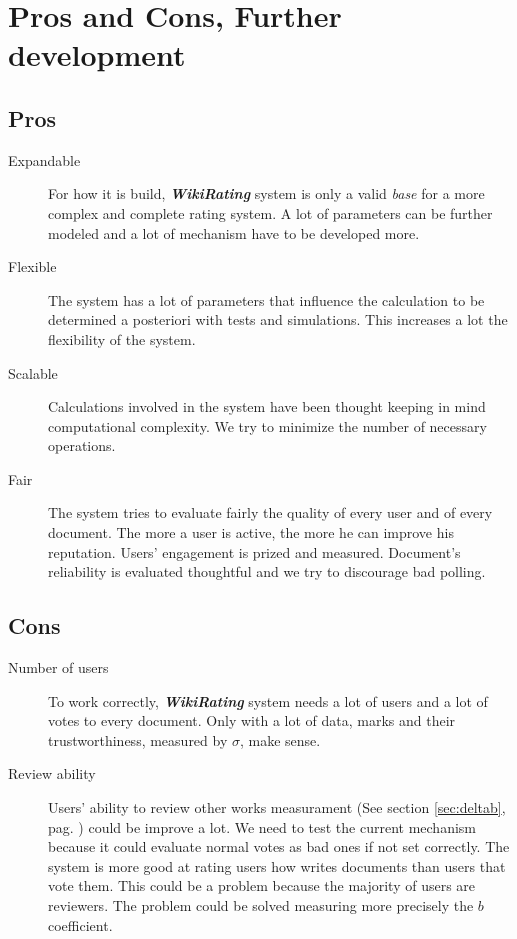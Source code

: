 \documentclass[a4paper,11pt]{article}
\newcommand{\wir}{\textbf{\textit{WikiRating }}}
\begin{document}
\newpage
\section{Pros and Cons, Further development}
\subsection{Pros}
\begin{description}
\item[Expandable] For how it is build, \wir system is only a valid \emph{base} for a more complex and complete rating system. A lot of parameters can be further modeled and a lot of mechanism have to be developed more.
\item[Flexible] The system has a lot of parameters that influence the calculation to be determined a posteriori with tests and simulations. This increases a lot the flexibility of the system.
\item [Scalable] Calculations involved in the system have been thought keeping in mind computational complexity. We try to minimize the number of necessary operations.
\item [Fair] The system tries to evaluate fairly the quality of every user and of every document. The more a user is active, the more he can improve his reputation. Users' engagement is prized and measured. Document's reliability is evaluated thoughtful and we try to discourage bad polling.
\end{description}

\subsection{Cons}
\begin{description}
\item[Number of users] To work correctly, \wir system needs a lot of users and a lot of votes to every document. Only with a lot of data, marks and their trustworthiness, measured by $\sigma$, make sense.
\item[Review ability] Users' ability to review other works measurament (See section \ref{sec:deltab}, pag. \pageref{sec:deltab}) could be improve a lot. We need to test the current mechanism because it could evaluate normal votes as bad ones if not set correctly. The system is more good at rating users how writes documents than users that vote them. This could be a problem because the majority of users are reviewers. The problem could be solved measuring more precisely the $b$ coefficient. 
\end{description}
\end{document}
